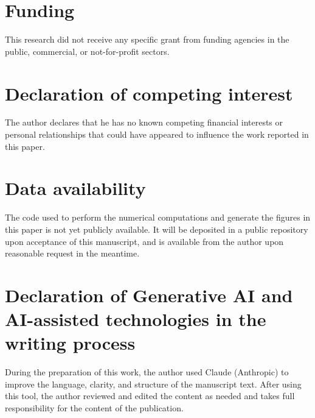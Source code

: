 \documentclass[preprint, 12pt]{elsarticle}
\theoremstyle{definition}
\theoremstyle{plain}
\theoremstyle{remark}
\begin{document}
\section*{Funding}
This research did not receive any specific grant from funding agencies in the public, commercial, or not-for-profit sectors.

\section*{Declaration of competing interest}
The author declares that he has no known competing financial interests or personal relationships that could have appeared to influence the work reported in this paper.

\section*{Data availability}
The code used to perform the numerical computations and generate the figures in this paper is not yet publicly available. It will be deposited in a public repository upon acceptance of this manuscript, and is available from the author upon reasonable request in the meantime.

\section*{Declaration of Generative AI and AI-assisted technologies in the writing process}
During the preparation of this work, the author used Claude (Anthropic) to improve the language, clarity, and structure of the manuscript text. After using this tool, the author reviewed and edited the content as needed and takes full responsibility for the content of the publication.



\end{document}
